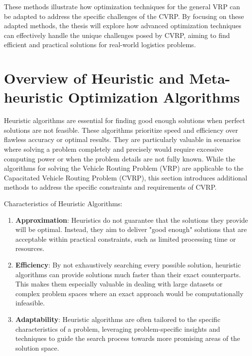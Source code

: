 \documentclass{article}
\begin{document}
    These methods illustrate how optimization techniques for the general VRP can be adapted to address the specific challenges of the CVRP. By focusing on these adapted methods, the thesis will explore how advanced optimization techniques can effectively handle the unique challenges posed by CVRP, aiming to find efficient and practical solutions for real-world logistics problems.


    \section{Overview of Heuristic and Meta-heuristic Optimization Algorithms}\label{overview-of-heuristic-and-meta-heuristic-optimization-algorithms}



    Heuristic algorithms are essential for finding good enough solutions when perfect solutions are not feasible. These algorithms prioritize speed and efficiency over flawless accuracy or optimal results. They are particularly valuable in scenarios where solving a problem completely and precisely would require excessive computing power or when the problem details are not fully known. While the algorithms for solving the Vehicle Routing Problem (VRP) are applicable to the Capacitated Vehicle Routing Problem (CVRP), this section introduces additional methods to address the specific constraints and requirements of CVRP. \cite{sharma2024metaheuristic}

    Characteristics of Heuristic Algorithms:
    \begin{enumerate}
        \item \textbf{Approximation}: Heuristics do not guarantee that the solutions they provide will be optimal. Instead, they aim to deliver "good enough" solutions that are acceptable within practical constraints, such as limited processing time or resources.
        \item \textbf{Efficiency}: By not exhaustively searching every possible solution, heuristic algorithms can provide solutions much faster than their exact counterparts. This makes them especially valuable in dealing with large datasets or complex problem spaces where an exact approach would be computationally infeasible.
        \item \textbf{Adaptability}: Heuristic algorithms are often tailored to the specific characteristics of a problem, leveraging problem-specific insights and techniques to guide the search process towards more promising areas of the solution space.
    \end{enumerate}
\end{document}
